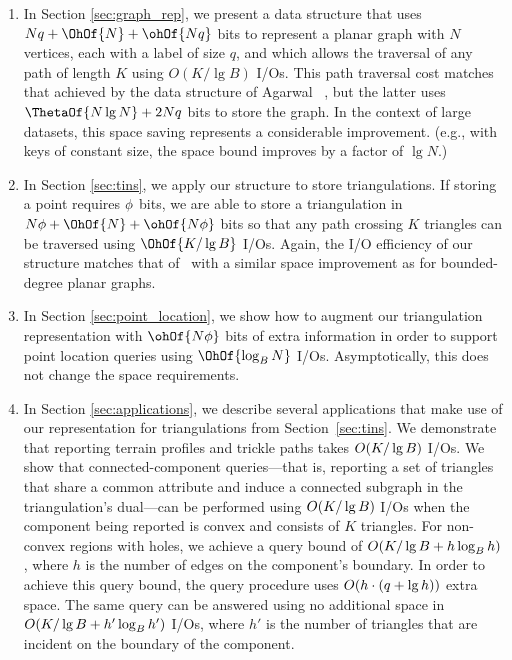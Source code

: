 {\begin{enumerate}
\item In Section \ref{sec:graph_rep}, we present a data structure that
  uses $Nq + \OhOf{N} + \ohOf{Nq}$ bits to represent a planar graph with $N$
  vertices, each with a label of size $q$, and which allows the traversal of
  any path of length $K$ using $O(K / \lg B)$ I/Os.
  This path traversal cost matches that achieved by the data structure of
  Agarwal \etal~\cite{DBLP:conf/soda/AgarwalAMVV98}, but the latter
  uses $\ThetaOf{N \lg N} + 2Nq$ bits to store the graph.
  In the context of large datasets, this space saving represents a
  considerable improvement.
  (e.g., with keys of constant size, the space bound improves by
  a factor of $\lg N$.)
\item In Section \ref{sec:tins}, we apply our structure to store
  triangulations.
  If storing a point requires $\phi$ bits, we are able to store a triangulation in
  $N \bitsPerPoint + \OhOf{N} + \ohOf{N \bitsPerPoint}$ bits so that any path crossing $K$
  triangles can be traversed using $\OhOf{K / \lg B}$ I/Os.
  Again, the I/O efficiency of our structure matches that
  of~\cite{DBLP:conf/soda/AgarwalAMVV98} with a similar space improvement
  as for bounded-degree planar graphs.
\item In Section \ref{sec:point_location}, we show how to
  augment our triangulation representation with $\ohOf{N\bitsPerPoint}$ bits of extra
  information in order to support point location 
  queries using $\OhOf{\log_B N}$ I/Os.
  Asymptotically, this does not change the space requirements.
\item In Section \ref{sec:applications}, we describe several
  applications that make use of our representation for triangulations
  from Section~\ref{sec:tins}.
  We demonstrate that reporting terrain profiles and trickle paths takes
  $O\!\left(K / \lg B\right)$ I/Os.
  We show that connected-component queries---that is, reporting a set of
  triangles that share a common attribute and induce a connected
  subgraph in the triangulation's dual---can be performed using
  $O\!\left(K / \lg B\right)$ I/Os when the component being reported is convex and consists
  of $K$ triangles.
  For non-convex regions with holes, we achieve a query bound of
  $O\!\left(K / \lg B + h \log_B h\right)$, where $h$ is the number
  of edges on the component's boundary.
  In order to achieve this query bound, the query procedure uses
  $O\!\left(h \cdot (q + \lg h)\right)$ extra space.
  The same query can be answered using no additional space in 
  $O\!\left(K / \lg B + h' \log_B h'\right)$ I/Os, where $h'$ is the number of
  triangles that are incident on the boundary of the component.
\end{enumerate}


}
